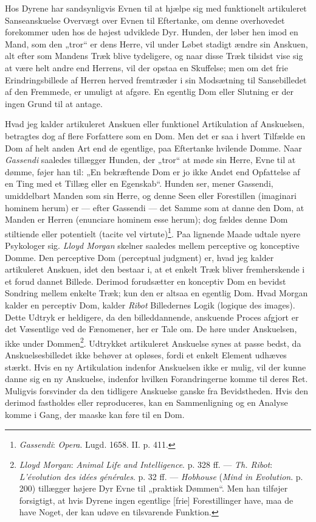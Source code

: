 \documentclass[12pt,a4paper]{book}
\newcommand{\opage}[1]{\marginnote{\footnotesize\textit{[#1]}}}
\newcommand{\apage}[1]{\marginnote{\footnotesize\textit{[#1]}}}
\begin{document}
Hos Dyrene har sandsynligvis Evnen til at hjælpe sig med funktionelt
artikuleret Sanseanskuelse Overvægt over Evnen til Eftertanke, om denne
overhovedet forekommer uden hos de højest udviklede Dyr. Hunden, der
løber hen imod en Mand, som den „tror“ er dens Herre, vil under \opage{55} Løbet
stadigt ændre sin Anskuen, alt efter som Mandens Træk blive tydeligere,
og naar disse Træk tilsidst vise sig at være helt andre end Herrens, vil
der opstaa en Skuffelse; men om det frie Erindringsbillede af Herren
herved fremtræder i sin Modsætning til Sansebilledet af den Fremmede, er
umuligt at afgøre. En egentlig Dom eller Slutning er der ingen Grund til
at antage.

Hvad jeg kalder artikuleret Anskuen eller funktionel Artikulation af
Anskuelsen, betragtes dog af flere Forfattere som en Dom. Men det er saa
i hvert Tilfælde en Dom af helt anden Art end de egentlige, paa
Eftertanke hvilende Domme. Naar \emph{Gassendi} saaledes tillægger
Hunden, der „tror“ at møde sin Herre, Evne til at dømme, føjer han til:
„En bekræftende Dom er jo ikke Andet end Opfattelse af en Ting med et
Tillæg eller en Egenskab“. Hunden ser, mener Gassendi, umiddelbart Manden
som sin Herre, og denne Seen eller Forestillen (imaginari hominem herum)
er --- efter Gassendi --- det Samme som at danne den Dom, at Manden er
Herren (enunciare hominem esse herum); dog fældes denne Dom stiltiende
eller potentielt (tacite vel virtute)\footnote{\emph{Gassendi}:
\emph{Opera}. Lugd. 1658. II. p. 411.}. Paa lignende Maade udtale nyere Psykologer sig. \emph{Lloyd Morgan} skelner saaledes mellem perceptive og
konceptive Domme. Den perceptive Dom (perceptual judgment) er, hvad jeg
kalder artikuleret Anskuen, idet den bestaar i, at et enkelt Træk bliver
fremherskende i et forud dannet Billede. Derimod forudsætter en
konceptiv Dom en bevidst Sondring mellem enkelte Træk; kun den er altsaa
en egentlig Dom. Hvad Morgan kalder en perceptiv Dom, kalder \emph{Ribot}
Billedernes Logik (logique des images). Dette Udtryk er heldigere, da den
billeddannende, anskuende Proces afgjort er det Væsentlige ved de
Fænomener, her er Tale om. De høre under Anskuelsen, ikke under
Dommen\footnote{\emph{Lloyd Morgan}: \emph{Animal Life and Intelligence}.
p. 328 ff. --- \emph{Th. Ribot}: \emph{L'évolution des idées générales}.
p. 32 ff. --- \emph{Hobhouse} (\emph{Mind in Evolution}. p. 200)
tillægger højere Dyr Evne til „praktisk Dømmen“. Men han tilføjer
forsigtigt, at hvis Dyrene ingen egentlige [frie] Forestillinger have,
maa de have Noget, der kan udøve en tilsvarende Funktion.}. Udtrykket
artikuleret Anskuelse synes at passe bedst, da Anskuelsesbilledet \apage{56} ikke
behøver at opløses, fordi et enkelt Element udhæves stærkt. Hvis en ny
Artikulation indenfor Anskuelsen ikke er mulig, vil der kunne danne sig
en ny Anskuelse, indenfor hvilken Forandringerne komme til deres Ret.
Muligvis forsvinder da den tidligere Anskuelse ganske fra Bevidstheden.
Hvis den derimod fastholdes eller reproduceres, kan en Sammenligning og
en Analyse komme i Gang, der maaske kan føre til en Dom.
\end{document}
